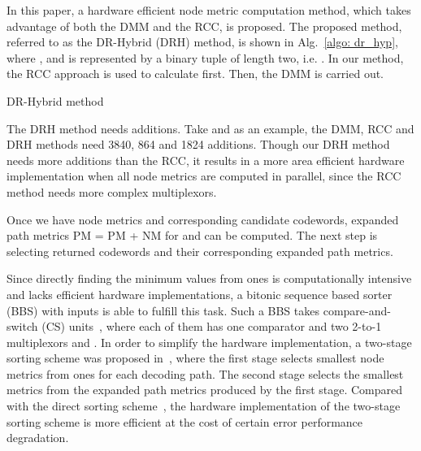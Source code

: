\documentclass[journal]{IEEEtran}
\begin{document}
In this paper, a hardware efficient node metric computation method, which takes advantage of both the
DMM and the RCC, is proposed. The proposed method, referred to as the DR-Hybrid (DRH) method, is shown in
Alg.~\ref{algo: dr_hyp}, where , and   is represented by a binary tuple of length two, i.e. . In
our method, the RCC approach is used to calculate  first. Then,
the DMM is carried out.

\begin{algorithm}
\caption{DR-Hybrid method}
\label{algo: dr_hyp}
\LinesNumbered
{}
\end{algorithm}

The DRH method needs  additions. Take  and  as an example, the DMM, RCC and DRH methods need 3840, 864 and 1824 additions. Though our DRH method needs more additions than the RCC, it results in a more area efficient hardware implementation when all  node metrics are computed in parallel, since the RCC method needs more complex multiplexors.


Once we have  node metrics and corresponding candidate codewords,  expanded path metrics PM = PM + NM for  and  can be computed. The next step is selecting  returned codewords and their corresponding expanded path metrics.

Since directly finding the  minimum values from  ones is computationally intensive and lacks efficient hardware implementations, a bitonic sequence based sorter~\cite{jun_low_mem_list} (BBS) with  inputs is able to fulfill this task. Such a BBS takes  compare-and-switch (CS) units~\cite{jun_low_mem_list}, where each of them has one comparator and two 2-to-1 multiplexors and .
In order to simplify the hardware implementation, a two-stage sorting scheme was proposed in~\cite{chenrong_tsp}, where the first stage selects  smallest node metrics from  ones for each decoding path. The second stage selects the  smallest metrics from the  expanded path metrics produced by the first stage. Compared with the direct sorting scheme~\cite{jun_low_mem_list, yuan_low_latency}, the hardware implementation of the two-stage sorting scheme is more efficient at the cost of certain error performance degradation.
\end{document}
